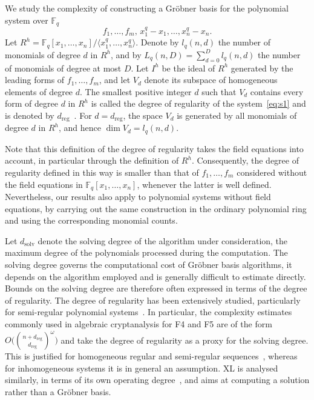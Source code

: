 \documentclass[a4paper, 12pt, oneside, openright]{article}
\begin{document}
We study the complexity of constructing a Gr\"obner basis for the polynomial system over $\mathbb F_q$
\begin{equation}\label{eq:s1}
    f_1,\dots,f_m,\, x_1^q-x_1,\dots,x_n^q-x_n.
\end{equation}
Let $R^h=\mathbb F_q[x_1,\dots,x_n]/\langle x_1^q,\dots,x_n^q\rangle$.
Denote by $l_q(n,d)$ the number of monomials of degree $d$ in $R^h$, and by $L_q(n,D)=\sum_{d=0}^D l_q(n,d)$ the number of monomials of degree at most $D$.
Let $I^h$ be the ideal of $R^h$ generated by the leading forms of $f_1,\dots,f_m$, and let $V_d$ denote its subspace of homogeneous elements of degree $d$. The smallest positive integer $d$ such that $V_d$ contains every form of degree $d$ in $R^h$ is called the degree of regularity of the system~\eqref{eq:s1} and is denoted by $d_{\mathrm{reg}}$~\cite{BFS03}.
For $d=d_{\mathrm{reg}}$, the space $V_d$ is generated by all monomials of degree $d$ in $R^h$, and hence $\dim V_d=l_q(n,d)$.

Note that this definition of the degree of regularity takes the field equations into account, in particular through the definition of $R^h$. Consequently, the degree of regularity defined in this way is smaller than that of $f_1,\ldots,f_m$ considered without the field equations in $\mathbb{F}_q[x_1,\ldots,x_n]$, whenever the latter is well defined.
Nevertheless, our results also apply to polynomial systems without field equations, by carrying out the same construction in the ordinary polynomial ring and using the corresponding monomial counts.

Let $d_{\mathrm{solv}}$ denote the solving degree of the algorithm under consideration, the maximum degree of the polynomials processed during the computation.
The solving degree  governs the computational cost  of Gr\"obner basis algorithms, it  depends on the algorithm employed and is generally difficult to estimate directly.
Bounds on the solving degree are therefore often expressed in terms of the degree of regularity. The degree of regularity has been extensively studied, particularly for semi-regular polynomial systems~\cite{BFS04}.
In particular, the complexity estimates commonly used in algebraic cryptanalysis for F4 and F5 are of the form $O\bigl(\binom{n+d_{\mathrm{reg}}}{d_{\mathrm{reg}}}^{\omega}\bigr)$ and take the degree of regularity as a proxy for the solving degree. This is justified for homogeneous regular and semi-regular sequences~\cite{BFS04}, whereas for inhomogeneous systems it is in general an assumption. XL is analysed similarly, in terms of its own operating degree~\cite{XLdeg}, and aims at computing a solution rather than a Gr\"obner basis.
\end{document}
